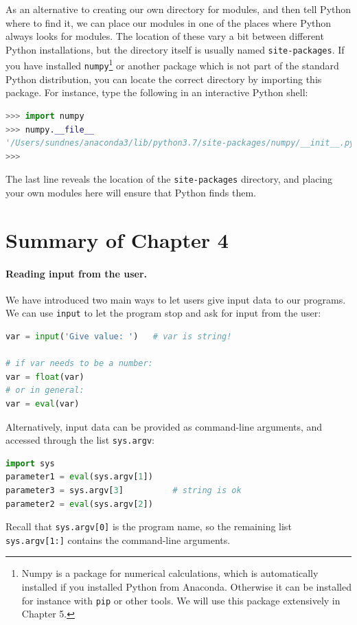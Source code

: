 \documentclass[graybox,envcountchap,sectrefs,final]{svmonodo}
\begin{document}
As an alternative to creating our own directory for modules, and then tell Python where to find it,
we can place our modules in one of the places where Python always looks for modules. The location of these vary a
bit between different Python installations, but the directory itself is usually named \texttt{site-packages}. If you have
installed \texttt{numpy}\footnote{Numpy is a package for numerical calculations, which is automatically installed if you installed Python from Anaconda. Otherwise it can be installed for instance with \texttt{pip} or other tools. We will use this package extensively in Chapter 5.} or another package which is not part of the standard Python distribution, you can locate the
correct directory by importing this package. For instance, type the following in an interactive Python shell:
\begin{lstlisting}[language=Python,style=blue1]
>>> import numpy
>>> numpy.__file__
'/Users/sundnes/anaconda3/lib/python3.7/site-packages/numpy/__init__.py'
>>>
\end{lstlisting}
The last line reveals the location of the \texttt{site-packages} directory, and placing your own modules here will ensure that
Python finds them.



\section{Summary of Chapter 4}

\paragraph{Reading input from the user.}
We have introduced two main ways to let users give input data to our programs. We can use \texttt{input} to let the program
stop and ask for input from the user:
\begin{lstlisting}[language=Python,style=blue1]
var = input('Give value: ')   # var is string!

# if var needs to be a number:
var = float(var)
# or in general:
var = eval(var)
\end{lstlisting}

Alternatively, input data can be provided as command-line arguments, and accessed through the list \texttt{sys.argv}:
\begin{lstlisting}[language=Python,style=blue1]
import sys
parameter1 = eval(sys.argv[1])
parameter3 = sys.argv[3]          # string is ok
parameter2 = eval(sys.argv[2])
\end{lstlisting}
Recall that \texttt{sys.argv[0]} is the program name, so the remaining list \texttt{sys.argv[1:]} contains the command-line arguments.
\end{document}

